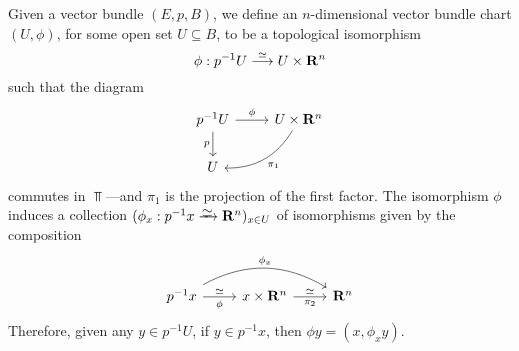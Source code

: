 \documentclass[../../../deep-dive]{subfile}
\begin{document}
\begin{definition}
    \label{def:vector-bundle-chart-and-atlas}
    Given a vector bundle \((E, p, B)\), we define an \(n\)-dimensional vector
    bundle chart \((U, \phi)\), for some open set \(U \subseteq B\), to be a
    topological isomorphism
    \[
        \phi: p^{-1} U \overset{\simeq}\longrightarrow U \times \mathbf{R}^n
    \]
    such that the diagram
    \[
        \begin{tikzcd}
            p^{-1} U \ar[r, "\phi"]
            \ar[d, "p"']
            &U \times \R^n \ar[ld, bend left, "\pi_1"] \\
            U &
        \end{tikzcd}
    \]
    commutes in \(\Top\)---and \(\pi_1\) is the projection of the first factor. The
    isomorphism \(\phi\) induces a collection
    \((\phi_x: p^{-1} x \isoto \R^n)_{x \in U}\) of isomorphisms given by the
    composition
    \[
        \begin{tikzcd}
            p^{-1} x \ar[r, "\phi"', "\dis"]
            \ar[rr, "\phi_x", bend left]
            &x \times \R^n
            \ar[r, "\dis", "\pi_2"']
            &\R^n
        \end{tikzcd}
    \]
    Therefore, given any \(y \in p^{-1} U\), if \(y \in p^{-1} x\), then
    \(\phi y = (x, \phi_x y)\).
\end{definition}
\end{document}
